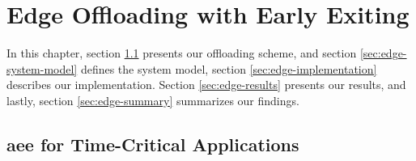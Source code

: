 \hypertarget{earlyexiting}{%
	\chapter{Edge Offloading with Early Exiting}\label{ch:edgeoffloading}}
\thispagestyle{fancy}

In this chapter, section \ref{sec:edge-aee} presents our offloading scheme, and section \ref{sec:edge-system-model} defines the system model, section \ref{sec:edge-implementation} describes our implementation. Section \ref{sec:edge-results} presents our results, and lastly, section \ref{sec:edge-summary} summarizes our findings.

\section{\acrfull{aee} for Time-Critical Applications} \label{sec:edge-aee}

